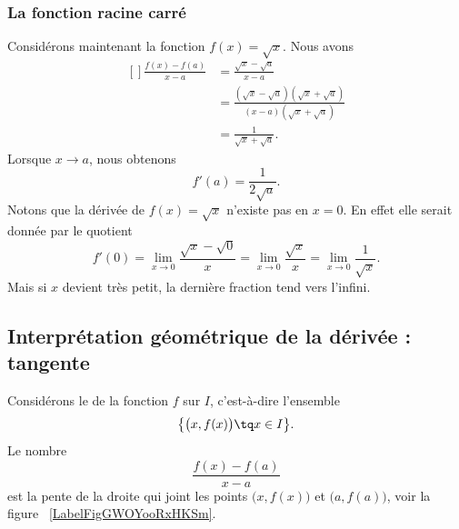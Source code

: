 \subsubsection{La fonction racine carré}

Considérons maintenant la fonction \( f(x)=\sqrt{x}\). Nous avons
\begin{equation}
	\begin{aligned}[]
		\frac{ f(x)-f(a) }{ x-a } & =\frac{ \sqrt{x}-\sqrt{a} }{ x-a }                                           \\
		                          & =\frac{ (\sqrt{x}-\sqrt{a})(\sqrt{x}+\sqrt{a}) }{ (x-a)(\sqrt{x}+\sqrt{a}) } \\
		                          & =\frac{1}{ \sqrt{x}+\sqrt{a} }.
	\end{aligned}
\end{equation}
Lorsque \( x\to a\), nous obtenons
\begin{equation}
	f'(a)=\frac{1}{ 2\sqrt{a} }.
\end{equation}
Notons que la dérivée de \( f(x)=\sqrt{x}\) n'existe pas en \( x=0\). En effet elle serait donnée par le quotient
\begin{equation}
	f'(0)=\lim_{x\to 0} \frac{ \sqrt{x}-\sqrt{0} }{ x }=\lim_{x\to 0} \frac{ \sqrt{x} }{ x }=\lim_{x\to 0} \frac{1}{ \sqrt{x} }.
\end{equation}
Mais si \( x\) devient très petit, la dernière fraction tend vers l'infini.

\subsection[Interprétation géométrique : tangente]{Interprétation géométrique de la dérivée : tangente}

Considérons le  de la fonction \( f\) sur \( I\), c'est-à-dire l'ensemble
\begin{equation}
	\big\{ \big( x,f(x) \big)\tq x\in I \big\}.
\end{equation}
Le nombre
\begin{equation}
	\frac{ f(x)-f(a) }{ x-a }
\end{equation}
est la pente de la droite qui joint les points \( \big( x,f(x) \big)\) et \( \big( a,f(a) \big)\), voir la figure ~\ref{LabelFigGWOYooRxHKSm}. %
\newcommand{\CaptionFigGWOYooRxHKSm}{Le coefficient directeur de la corde entre \( a\) et \( x\).}


